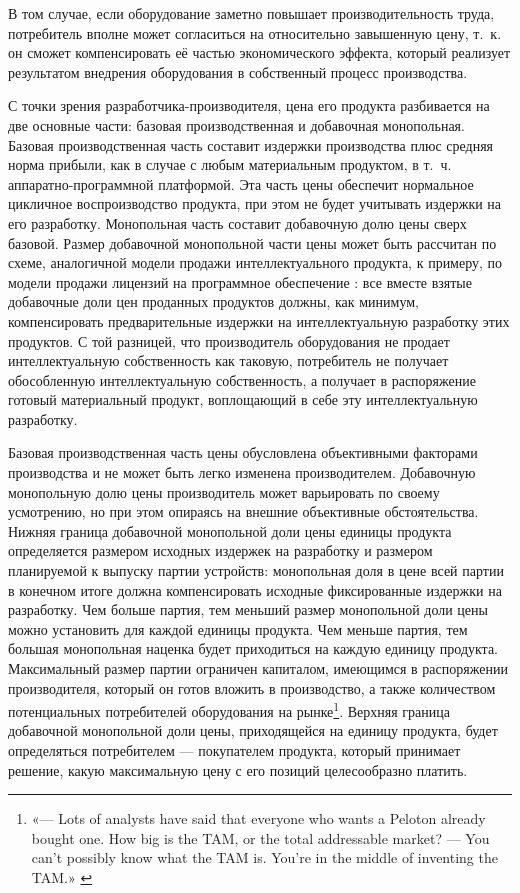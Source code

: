 \documentclass{article}
\begin{document}
В том случае, если оборудование заметно повышает производительность труда, потребитель вполне может согласиться на относительно завышенную цену, т.~к. он сможет компенсировать её частью экономического эффекта, который реализует результатом внедрения оборудования в собственный процесс производства.

С точки зрения разработчика-производителя, цена его продукта разбивается на две основные части: базовая производственная и добавочная монопольная. Базовая производственная часть составит издержки производства плюс средняя норма прибыли, как в случае с любым материальным продуктом, в т.~ч. аппаратно-программной платформой. Эта часть цены обеспечит нормальное цикличное воспроизводство продукта, при этом не будет учитывать издержки на его разработку. Монопольная часть составит добавочную долю цены сверх базовой. Размер добавочной монопольной части цены может быть рассчитан по схеме, аналогичной модели продажи интеллектуального продукта, к примеру, по модели продажи лицензий на программное обеспечение \cite{businessModels}: все вместе взятые добавочные доли цен проданных продуктов должны, как минимум, компенсировать предварительные издержки на интеллектуальную разработку этих продуктов. С той разницей, что производитель оборудования не продает интеллектуальную собственность как таковую, потребитель не получает обособленную интеллектуальную собственность, а получает в распоряжение готовый материальный продукт, воплощающий в себе эту интеллектуальную разработку.

Базовая производственная часть цены обусловлена объективными факторами производства и не может быть легко изменена производителем. Добавочную монопольную долю цены производитель может варьировать по своему усмотрению, но при этом опираясь на внешние объективные обстоятельства. Нижняя граница добавочной монопольной доли цены единицы продукта определяется размером исходных издержек на разработку и размером планируемой к выпуску партии устройств: монопольная доля в цене всей партии в конечном итоге должна компенсировать исходные фиксированные издержки на разработку. Чем больше партия, тем меньший размер монопольной доли цены можно установить для каждой единицы продукта. Чем меньше партия, тем большая монопольная наценка будет приходиться на каждую единицу продукта. Максимальный размер партии ограничен капиталом, имеющимся в распоряжении производителя, который он готов вложить в производство, а также количеством потенциальных потребителей оборудования на рынке\footnote{«— Lots of analysts have said that everyone who wants a Peloton already bought one. How big is the TAM, or the total addressable market? — You can’t possibly know what the TAM is. You’re in the middle of inventing the TAM.» \cite{nyTimesPeloton2022}}. Верхняя граница добавочной монопольной доли цены, приходящейся на единицу продукта, будет определяться потребителем — покупателем продукта, который принимает решение, какую максимальную цену с его позиций целесообразно платить.
\end{document}
